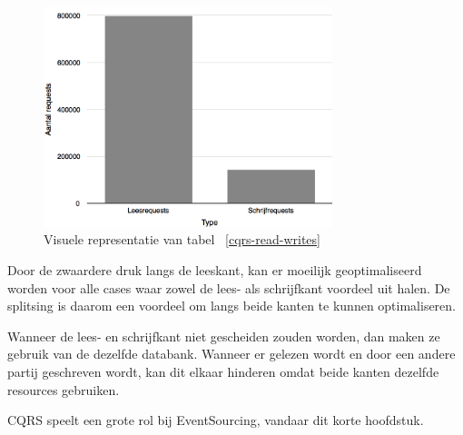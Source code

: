 \begin{figure}[h]
\caption{Visuele representatie van tabel ~\ref{cqrs-read-writes}}
\centering
\includegraphics[width=0.75\textwidth]{img/lees-en-schrijfkant}
\end{figure}

Door de zwaardere druk langs de leeskant, kan er moeilijk geoptimaliseerd worden voor alle cases waar zowel de lees- als schrijfkant voordeel uit halen. De splitsing is daarom een voordeel om langs beide kanten te kunnen optimaliseren.

Wanneer de lees- en schrijfkant niet gescheiden zouden worden, dan maken ze gebruik van de dezelfde databank. Wanneer er gelezen wordt en door een andere partij geschreven wordt, kan dit elkaar hinderen omdat beide kanten dezelfde resources gebruiken.

\gls{CQRS} speelt een grote rol bij EventSourcing, vandaar dit korte hoofdstuk.
